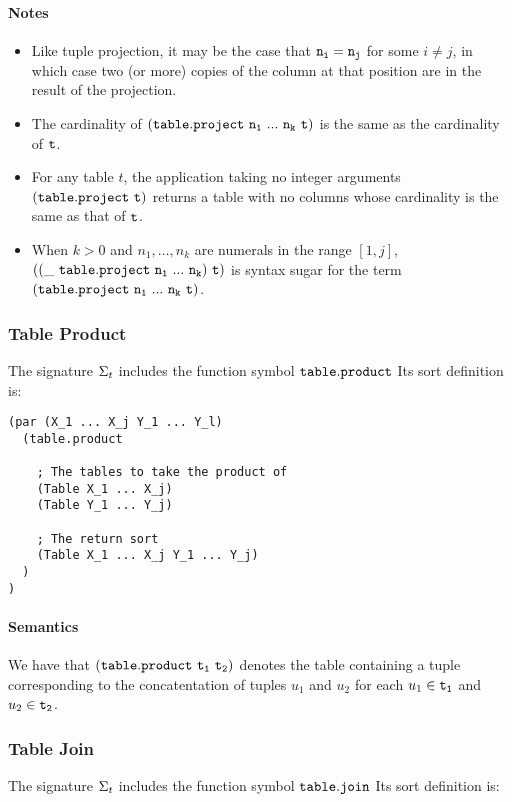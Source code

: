\documentclass[english,a4paper,10pt]{article}
\begin{document}
\paragraph{Notes}
\begin{itemize}
\item
Like tuple projection,
it may be the case that ${\tt n_i} = {\tt n_j}$ for some $i \neq j$,
in which case two (or more) copies of the column at that position
are in the result of the projection.
\item
The cardinality of $\syntax{(table.project\ n_1\ ...\ n_k\ t)}$ is
the same as the cardinality of ${\tt t}$.
\item
For any table $t$,
the application taking no integer arguments ${\tt (table.project\ t)}$ 
returns a table with no columns whose cardinality is the same as that of ${\tt t}$.
\item
When $k>0$ and
$n_1, \ldots, n_k$ are numerals in the range $[1, j]$,
$\syntax{((\_\ table.project\ n_1\ ...\ n_k)\ t)}$ is syntax sugar for the term
$\syntax{(table.project\ n_1\ ...\ n_k\ t)}$.
\end{itemize}

\subsubsection{Table Product}
The signature $\Sigma_{t}$ includes 
the function symbol ${\tt table.product}$
Its sort definition is:

\begin{verbatim}
(par (X_1 ... X_j Y_1 ... Y_l)
  (table.product
  
    ; The tables to take the product of
    (Table X_1 ... X_j)
    (Table Y_1 ... Y_j)

    ; The return sort
    (Table X_1 ... X_j Y_1 ... Y_j)
  )
)
\end{verbatim}
\paragraph{Semantics}
We have that $\syntax{(table.product\ t_1\ t_2)}$
denotes the table containing a tuple corresponding to the concatentation
of tuples $u_1$ and $u_2$
for each $u_1 \in {\tt t_1}$ and $u_2 \in {\tt t_2}$.

\subsubsection{Table Join}
The signature $\Sigma_{t}$ includes 
the function symbol ${\tt table.join}$
Its sort definition is:
\end{document}
